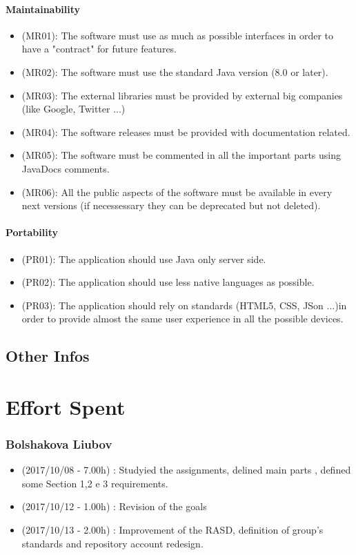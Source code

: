 \documentclass[a4paper]{book}
\begin{document}
\subsection{Maintainability}
\begin{itemize}
\item (MR01): The software must use as much as possible interfaces in order to have a "contract" for future features.
\item (MR02): The software must use the standard Java version (8.0 or later).
\item (MR03): The external libraries must be provided by external big companies (like Google, Twitter ...)
\item (MR04): The software releases must be provided with documentation related.
\item (MR05): The software must be commented in all the important parts using JavaDocs comments.
\item (MR06): All the public aspects of the software must be available in every next versions (if necessessary they can be deprecated but not deleted).
\end{itemize}

\subsection{Portability}
\begin{itemize}
\item (PR01): The application should use Java only server side.
\item (PR02): The application should use less native languages as possible.
\item (PR03): The application should rely on standards (HTML5, CSS, JSon ...)in order to provide almost the same user experience in all the possible devices.
\end{itemize}

\chapter{Other Infos}

\part{Effort Spent}

\section{Bolshakova Liubov}
\begin{itemize}
\item (2017/10/08 - 7.00h) : Studyied the assignments, delined main parts , defined some Section 1,2 e 3 requirements.
\item (2017/10/12 - 1.00h) : Revision of the goals 
\item (2017/10/13 - 2.00h) : Improvement of the RASD, definition of group's standards and repository account redesign.
\end{itemize}
\end{document}
